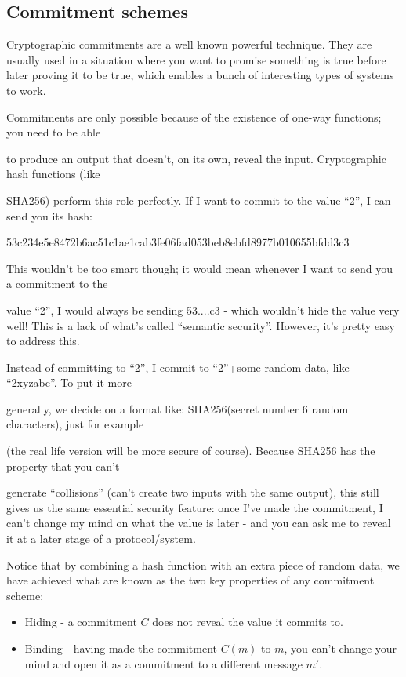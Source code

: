 \documentclass[10pt,a4paper]{article}
\providecommand{\tightlist}{%
  \setlength{\itemsep}{0pt}\setlength{\parskip}{0pt}}
\begin{document}
\hypertarget{commitment-schemes}{%
\subsection[Commitment
schemes]{\texorpdfstring{\protect\hypertarget{anchor-14}{}{}Commitment
schemes}{Commitment schemes}}\label{commitment-schemes}}

Cryptographic commitments are a well known powerful technique. They are
usually used in a situation where you want to promise something is true
before later proving it to be true, which enables a bunch of interesting
types of systems to work.

Commitments are only possible because of the existence of one-way
functions; you need to be able

to produce an output that doesn't, on its own, reveal the input.
Cryptographic hash functions (like

SHA256) perform this role perfectly. If I want to commit to the value
``2'', I can send you its hash:

53c234e5e8472b6ac51c1ae1cab3fe06fad053beb8ebfd8977b010655bfdd3c3

This wouldn't be too smart though; it would mean whenever I want to send
you a commitment to the

value ``2'', I would always be sending 53....c3 - which wouldn't hide
the value very well! This is a lack of what's called ``semantic
security''. However, it's pretty easy to address this.

Instead of committing to ``2'', I commit to ``2''+some random data, like
``2xyzabc''. To put it more

generally, we decide on a format like: SHA256(secret number
\textbar{}\textbar{} 6 random characters), just for example

(the real life version will be more secure of course). Because SHA256
has the property that you can't

generate ``collisions'' (can't create two inputs with the same output),
this still gives us the same essential security feature: once I've made
the commitment, I can't change my mind on what the value is later - and
you can ask me to reveal it at a later stage of a protocol/system.

Notice that by combining a hash function with an extra piece of random
data, we have achieved what are known as the two key properties of any
commitment scheme:

\begin{itemize}
\tightlist
\item
  Hiding - a commitment $C$ does not reveal the value it commits to.
\item
  Binding - having made the commitment $C(m)$ to $m$, you can't change your mind
  and open it as a commitment to a different message $m'$.
\end{itemize}
\end{document}
